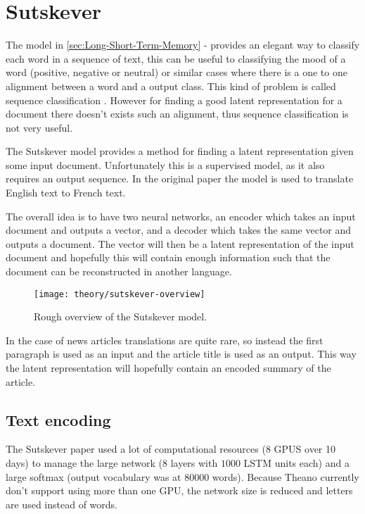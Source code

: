 
\section{Sutskever}

The model in \autoref{sec:Long-Short-Term-Memory} -  provides an elegant way to classify each word in a sequence of text, this can be useful to classifying the mood of a word (positive, negative or neutral) or similar cases where there is a one to one alignment between a word and a output class. This kind of problem is called sequence classification \cite[p.~10]{alexgraves}. However for finding a good latent representation for a document there doesn't exists such an alignment, thus sequence classification is not very useful.

The Sutskever model provides a method for finding a latent representation given some input document. Unfortunately this is a supervised model, as it also requires an output sequence. In the original paper \cite{sutskever} the model is used to translate English text to French text.

The overall idea is to have two neural networks, an encoder which takes an input document and outputs a vector, and a decoder which takes the same vector and outputs a document. The vector will then be a latent representation of the input document and hopefully this will contain enough information such that the document can be reconstructed in another language.

\begin{figure}[H]
	\centering
	\texttt{[image: theory/sutskever-overview]}
	\caption{Rough overview of the Sutskever model.}
\end{figure}

In the case of news articles translations are quite rare, so instead the first paragraph is used as an input and the article title is used as an output. This way the latent representation will hopefully contain an encoded summary of the article.

\subsection{Text encoding}

The Sutskever paper \cite{sutskever} used a lot of computational resources (8 GPUS over 10 days) to manage the large network (8 layers with $1000$ LSTM units each) and a large softmax (output vocabulary was at 80000 words). Because Theano currently don't support using more than one GPU, the network size is reduced and letters are used instead of words.

